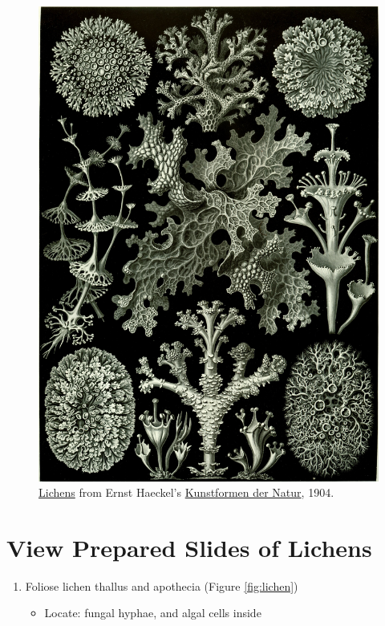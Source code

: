 \begin{figure}

{\centering \includegraphics[width=0.7\linewidth]{./figures/fungi/Haeckel_Lichenes}

}

\caption{\href{https://commons.wikimedia.org/wiki/File:Haeckel_Lichenes.jpg}{Lichens}
from Ernst Haeckel's
\href{https://en.wikipedia.org/wiki/Kunstformen_der_Natur}{Kunstformen
der Natur}, 1904.}\label{fig:lichens}
\end{figure}

\section{View Prepared Slides of
Lichens}\label{view-the-prepared-slides-of-lichens}

\begin{enumerate}
\def\labelenumi{\arabic{enumi}.}
\tightlist
\item
  Foliose lichen thallus and apothecia (Figure \ref{fig:lichen})

  \begin{itemize}
  \tightlist
  \item
    Locate: fungal hyphae, and algal cells inside
  \end{itemize}
\end{enumerate}

